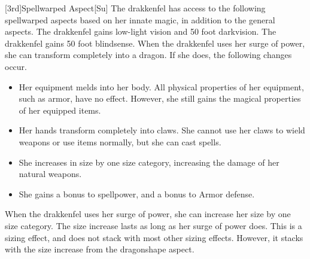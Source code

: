         [3rd]{Spellwarped Aspect}[Su]
        The drakkenfel has access to the following spellwarped aspects based on her innate magic, in addition to the general aspects.
        The drakkenfel gains low-light vision and 50 foot darkvision.
        The drakkenfel gains 50 foot blindsense.
        When the drakkenfel uses her surge of power, she can transform completely into a dragon.
        If she does, the following changes occur.
        \begin{itemize}
            \item Her equipment melds into her body. All physical properties of her equipment, such as armor, have no effect. However, she still gains the magical properties of her equipped items.
            \item Her hands transform completely into claws. She cannot use her claws to wield weapons or use items normally, but she can cast spells.
            \item She increases in size by one size category, increasing the damage of her natural weapons.
            \item She gains a  bonus to spellpower, and a  bonus to Armor defense.
        \end{itemize}
        When the drakkenfel uses her surge of power, she can increase her size by one size category.
        The size increase lasts as long as her surge of power does.
        This is a sizing effect, and does not stack with most other sizing effects.
        However, it stacks with the size increase from the dragonshape aspect.

